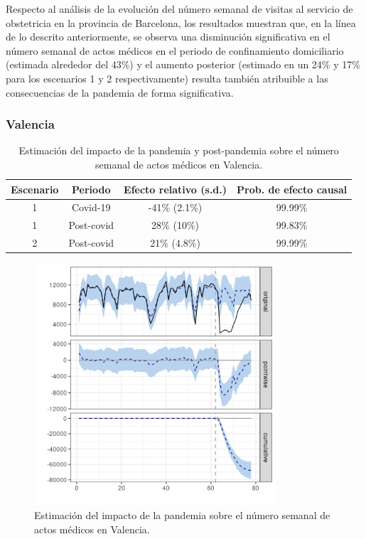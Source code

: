 \documentclass[12pt,twoside]{article} %
\begin{document}
Respecto al análisis de la evolución del número semanal de visitas al servicio de obstetricia en la provincia de Barcelona, los resultados muestran que, en la línea de lo descrito anteriormente, se observa una disminución significativa en el número semanal de actos médicos en el periodo de confinamiento domiciliario (estimada alrededor del 43\%) y el aumento posterior (estimado en un 24\% y 17\% para los escenarios 1 y 2 respectivamente) resulta también atribuible a las consecuencias de la pandemia de forma significativa.      

\subsubsection{Valencia}\label{valencia}
\begin{table}[H]\caption{Estimación del impacto de la pandemia y post-pandemia sobre el número semanal de actos médicos en Valencia.}
    \centering  
    \begin{tabular}{ |c|c|c|c| }
        \hline
     \textbf{Escenario} & \textbf{Periodo} & \textbf{Efecto relativo (s.d.)} & \textbf{Prob. de efecto causal} \\ 
     \hline
     1 & Covid-19 & -41\% (2.1\%) & 99.99\% \\  
     1 & Post-covid & 28\% (10\%) &  99.83\% \\
     \hline   
     2 & Post-covid & 21\% (4.8\%) & 99.99\% \\
     \hline
    \end{tabular}
  \end{table}
  
  \begin{center}
    \begin{figure}[H]
      \includegraphics[width=9cm]{global_covid_Valencia.png}\caption{Estimación del impacto de la pandemia sobre el número semanal de actos médicos en Valencia.}
    \end{figure}
    \end{center}
    
\end{document}
